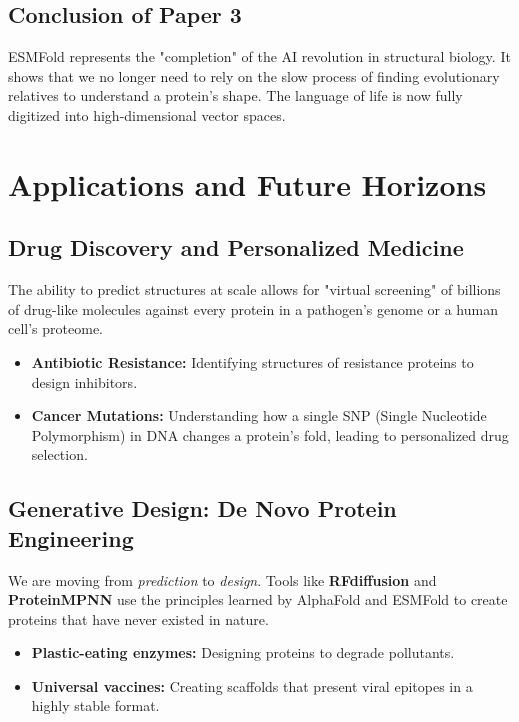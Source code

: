 ﻿\documentclass[12pt,a4paper]{article}
\begin{document}
\subsection{Conclusion of Paper 3}
ESMFold represents the "completion" of the AI revolution in structural biology. It shows that we no longer need to rely on the slow process of finding evolutionary relatives to understand a protein's shape. The language of life is now fully digitized into high-dimensional vector spaces.

\newpage
\section{Applications and Future Horizons}

\subsection{Drug Discovery and Personalized Medicine}
The ability to predict structures at scale allows for "virtual screening" of billions of drug-like molecules against every protein in a pathogen's genome or a human cell's proteome.
\begin{itemize}[leftmargin=*, itemsep=4pt]
    \item \textbf{Antibiotic Resistance:} Identifying structures of resistance proteins to design inhibitors.
    \item \textbf{Cancer Mutations:} Understanding how a single SNP (Single Nucleotide Polymorphism) in DNA changes a protein's fold, leading to personalized drug selection.
\end{itemize}

\subsection{Generative Design: De Novo Protein Engineering}
We are moving from \emph{prediction} to \emph{design}. Tools like \textbf{RFdiffusion} and \textbf{ProteinMPNN} use the principles learned by AlphaFold and ESMFold to create proteins that have never existed in nature.
\begin{itemize}[leftmargin=*, itemsep=4pt]
    \item \textbf{Plastic-eating enzymes:} Designing proteins to degrade pollutants.
    \item \textbf{Universal vaccines:} Creating scaffolds that present viral epitopes in a highly stable format.
\end{itemize}
\end{document}
